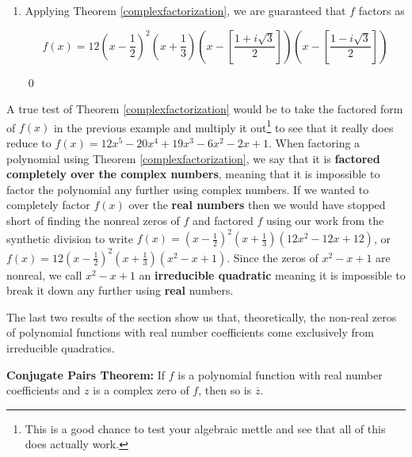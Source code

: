 \documentclass{ximera}
\begin{document}
\begin{example}
\begin{enumerate}
\item  Applying Theorem \ref{complexfactorization}, we are guaranteed that $f$ factors as

\[f(x) = 12 \left(x- \dfrac{1}{2}\right)^2 \left(x + \dfrac{1}{3}\right) \left(x - \left[\dfrac{1 + i \sqrt{3}}{2}\right]\right) \left(x - \left[\dfrac{1 - i \sqrt{3}}{2}\right]\right)\]

\vspace{-.4in} \qed

\end{enumerate}

\end{example}

A true test of Theorem \ref{complexfactorization} would be to take the factored form of $f(x)$ in the previous example and multiply it out\footnote{This is a good chance to test your algebraic mettle and see that all of this does actually work.} to see that it really does reduce to  $f(x) = 12x^5 - 20x^4+19x^3-6x^2-2x+1$.  When factoring a polynomial using Theorem \ref{complexfactorization}, we say that it is  \textbf{factored completely over the complex numbers}, meaning that it is impossible to factor the polynomial any further using complex numbers.  If we wanted to   completely factor $f(x)$ over the \textbf{real numbers} then we would have stopped short of finding the nonreal zeros of $f$ and factored $f$ using our work from the synthetic division to write $f(x) = \left(x - \frac{1}{2} \right)^2 \left(x + \frac{1}{3} \right)\left(12x^2 - 12x + 12\right)$, or $f(x) = 12\left(x - \frac{1}{2} \right)^2 \left(x + \frac{1}{3} \right)\left(x^2 - x + 1\right)$.  Since the zeros of $x^2-x+1$ are nonreal, we call $x^2-x+1$ an \textbf{irreducible quadratic} meaning it is impossible to break it down any further using \textbf{real} numbers.  

 

The last two results of the section show us that, theoretically, the non-real zeros of polynomial functions with real number coefficients come exclusively from irreducible quadratics.

 


\begin{theorem} \label{conjugatepairsthm}\textbf{Conjugate Pairs Theorem:} If $f$ is a polynomial function with real number coefficients and $z$ is a complex zero of $f$, then so is $\overline{z}$. 

\end{theorem}
\end{document}

